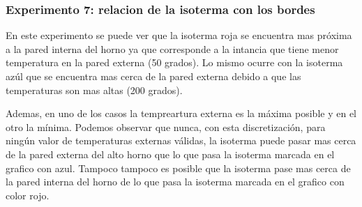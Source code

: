   \subsubsection*{Experimento 7: relacion de la isoterma con los bordes}
     En este experimento se puede ver que la isoterma roja se encuentra mas próxima a la pared interna del horno ya que corresponde a la intancia que tiene menor temperatura en la pared externa (50 grados). Lo mismo ocurre con la isoterma azúl que se encuentra mas cerca de la pared externa debido a que las temperaturas son mas altas (200 grados).

     Ademas, en uno de los casos la tempreartura externa es la máxima posible y en el otro la mínima. Podemos observar que nunca, con esta discretización, para ningún valor de temperaturas externas válidas, la isoterma puede pasar mas cerca de la pared externa del alto horno que lo que pasa la isoterma marcada en el grafico con azul. Tampoco tampoco es posible que la isoterma pase mas cerca de la pared interna del horno de lo que pasa la isoterma marcada en el grafico con color rojo.
